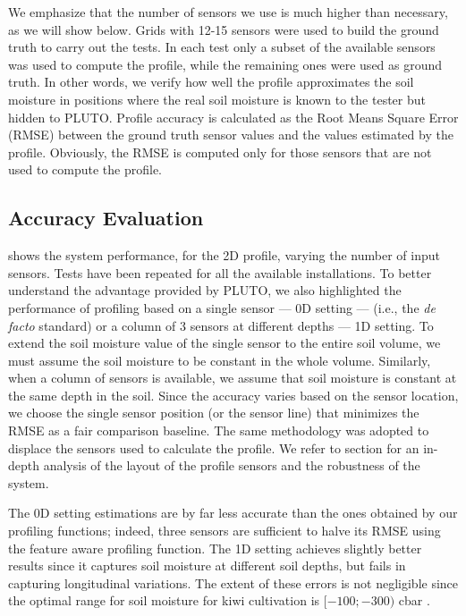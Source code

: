 We emphasize that the number of sensors we use is much higher than necessary, as we will show below. 
Grids with 12-15 sensors were used to build the ground truth to carry out the tests. In each test only a subset of the available sensors was used to compute the profile, while the remaining ones were used as ground truth. In other words, we verify how well the profile approximates the soil moisture in positions where the real soil moisture is known to the tester but hidden to PLUTO. Profile accuracy is calculated as the Root Means Square Error (RMSE) between the ground truth sensor values and the values estimated by the profile. Obviously, the RMSE is computed only for those sensors that are not used to compute the profile.

\subsection{Accuracy Evaluation}
\label{pluto-sec:ApproachEvaluation}
 shows the system performance, for the 2D profile, varying the number of input sensors. Tests have been repeated for all the available installations.
To better understand the advantage provided by PLUTO, we also highlighted the performance of profiling based on a single sensor --- 0D setting --- (i.e., the \emph{de facto} standard) or a column of 3 sensors at different depths --- 1D setting. 
To extend the soil moisture value of the single sensor to the entire soil volume, we must assume the soil moisture to be constant in the whole volume. 
Similarly, when a column of sensors is available, we assume that soil moisture is constant at the same depth in the soil.
Since the accuracy varies based on the sensor location, we choose the single sensor position (or the sensor line) that minimizes the RMSE as a fair comparison baseline.
The same methodology was adopted to displace the sensors used to calculate the profile. 
We refer to section  for an in-depth analysis of the layout of the profile sensors and the robustness of the system.

The 0D setting estimations are by far less accurate than the ones obtained by our profiling functions; indeed, three sensors are sufficient to halve its RMSE using the feature aware profiling function. 
The 1D setting achieves slightly better results since it captures soil moisture at different soil depths, but fails in capturing longitudinal variations. 
The extent of these errors is not negligible since the optimal range for soil moisture for kiwi cultivation is $[-100;-300)$ cbar \cite{miller1998effects}.

